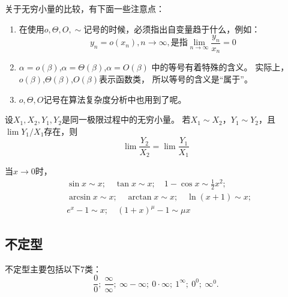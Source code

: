 \begin{remark}
  关于无穷小量的比较，有下面一些注意点：
  \begin{enumerate}
    \item
    在使用$o,\Theta,O,\sim$记号的时候，必须指出自变量趋于什么，例如：
    \begin{displaymath}
      y_n=o(x_n), n\to\infty,\text{是指}\lim_{n\to\infty}\frac{y_n}{x_n}=0
    \end{displaymath}
    \item
    $\alpha=o(\beta)$,$\alpha=\Theta(\beta)$,$\alpha=O(\beta)$
    中的等号有着特殊的含义。
    实际上，$o(\beta)$,$\Theta(\beta)$,$O(\beta)$表示函数类，
    所以等号的含义是``属于''。
    \item
    $o,\Theta,O$记号在算法复杂度分析中也用到了呢。
  \end{enumerate}
\end{remark}

\begin{theorem}[替换定理]
  设$X_1,X_2,Y_1,Y_2$是同一极限过程中的无穷小量。
  若$X_1\sim X_2$，$Y_1\sim Y_2$，且$\lim Y_1/X_1$存在，则
  \begin{displaymath}
    \lim \frac{Y_2}{X_2}=\lim \frac{Y_1}{X_1}
  \end{displaymath}
\end{theorem}

\begin{theorem}[常用的等价无穷小]
  当$x\to 0$时，
  \begin{align*}
    & \sin x \sim x;\quad \tan x \sim x;\quad 1-\cos x \sim \frac{1}{2}x^2;  \\
    & \arcsin x \sim x;\quad \arctan x \sim x;\quad \ln(x+1)\sim x; \\
    & e^x-1\sim x;\quad (1+x)^\mu - 1 \sim \mu x
  \end{align*}
\end{theorem}

\subsection{不定型}
不定型主要包括以下7类：
\begin{displaymath}
  \frac{0}{0};\ \frac{\infty}{\infty};\ \infty-\infty;\ 0\cdot\infty;
  \ 1^\infty;\ 0^0;\ \infty^0.
\end{displaymath}